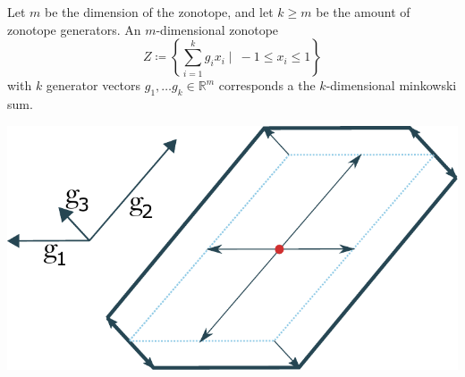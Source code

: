 \documentclass[
  a4paper,  %
  twoside,  %
  bibliography=totoc,
  headsepline,
  cleardoublepage=empty,
  parskip=half,
  draft=false
]{scrbook}
\begin{document}
\begin{definition}[Zonotope]
Let $m$ be the dimension of the zonotope, and let $k \geq  m$ be the amount of zonotope generators.
An $m$-dimensional zonotope
\begin{equation}
Z \coloneqq \left\{\sum_{i=1}^k g_i x_i \mid ~ -1 \leq x_i \leq 1\right\}
  \label{zonotope}
\end{equation}
with $k$ generator vectors $g_1, \dots g_k \in \mathds{R}^m$ corresponds a the $k$-dimensional minkowski sum.
\end{definition}


\begin{mdframed}[style=style]
        \centering
\begin{minipage}{.45\textwidth}
        \centering
  \label{fig:zonotope}
    \end{minipage}%
    \begin{minipage}{0.55\textwidth}
        \centering
        \vspace{3.5mm}
  \includegraphics[width=0.8\linewidth]{graphics/zonotope}
  \hspace{-5.5mm}
    \end{minipage}
\end{mdframed}
\end{document}
